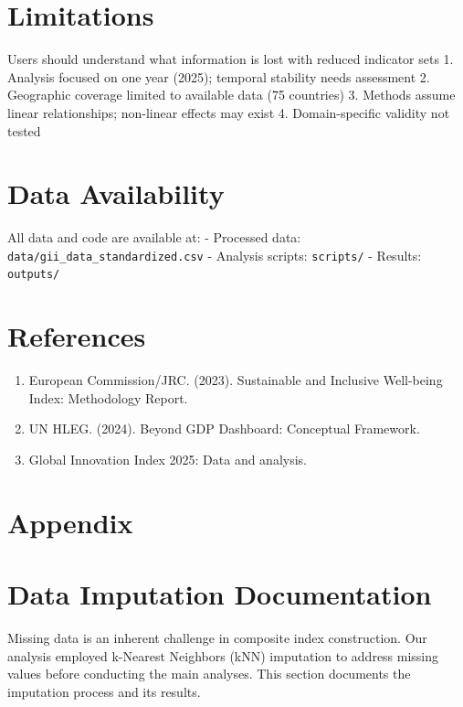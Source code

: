 \documentclass[
  letterpaper,
  DIV=11,
  numbers=noendperiod]{scrartcl}
\providecommand{\tightlist}{%
  \setlength{\itemsep}{0pt}\setlength{\parskip}{0pt}}
\begin{document}
\section{Limitations}\label{limitations}

Users should understand what information is lost with reduced indicator
sets 1. Analysis focused on one year (2025); temporal stability needs
assessment 2. Geographic coverage limited to available data (75
countries) 3. Methods assume linear relationships; non-linear effects
may exist 4. Domain-specific validity not tested

\section{Data Availability}\label{data-availability}

All data and code are available at: - Processed data:
\texttt{data/gii\_data\_standardized.csv} - Analysis scripts:
\texttt{scripts/} - Results: \texttt{outputs/}

\section{References}\label{references}

\begin{enumerate}
\def\labelenumi{\arabic{enumi}.}
\tightlist
\item
  European Commission/JRC. (2023). Sustainable and Inclusive Well-being
  Index: Methodology Report.
\item
  UN HLEG. (2024). Beyond GDP Dashboard: Conceptual Framework.
\item
  Global Innovation Index 2025: Data and analysis.
\end{enumerate}

\section{Appendix}\label{appendix}

\section{Data Imputation
Documentation}\label{data-imputation-documentation}

Missing data is an inherent challenge in composite index construction.
Our analysis employed k-Nearest Neighbors (kNN) imputation to address
missing values before conducting the main analyses. This section
documents the imputation process and its results.
\end{document}
